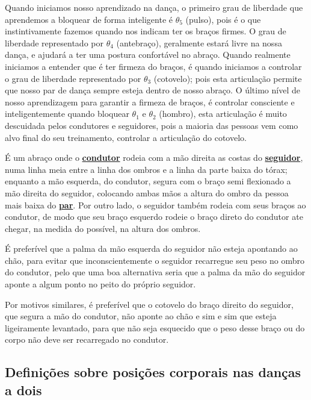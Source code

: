Quando iniciamos nosso aprendizado na dança, 
o primeiro grau de liberdade que aprendemos a bloquear de forma inteligente é $\theta_5$ (pulso),
pois é o que instintivamente fazemos quando nos indicam ter os braços firmes.
O grau de liberdade representado por $\theta_4$ (antebraço), geralmente estará livre na nossa dança,
e ajudará a ter uma postura confortável no abraço.
Quando realmente iniciamos a entender que é ter firmeza do braços,
é quando iniciamos a controlar o grau de liberdade representado por $\theta_3$ (cotovelo);
pois esta articulação permite que nosso par de dança sempre esteja dentro de nosso abraço.
O último nível de nosso aprendizagem para garantir a firmeza de braços,
é controlar consciente e inteligentemente quando bloquear  $\theta_1$ e $\theta_2$ (hombro),
esta articulação é muito descuidada pelos condutores e seguidores,
pois a maioria das pessoas vem como alvo final do seu treinamento,
controlar a articulação do cotovelo. 

\begin{definition}
\label{def:abracodedanca}  
É um abraço onde o \hyperref[def:Condutor]{\textbf{condutor}} 
rodeia com a mão direita as costas do \hyperref[def:Seguidor]{\textbf{seguidor}},
numa linha meia entre a linha dos ombros e a linha da parte baixa do tórax;
enquanto a mão esquerda, do condutor, segura com o braço semi flexionado a mão direita do seguidor,
colocando ambas mãos a altura do ombro da pessoa mais baixa do \hyperref[def:Par]{\textbf{par}}.
Por outro lado, o seguidor também rodeia com seus braços ao condutor,
de modo que seu braço esquerdo rodeie o braço direto do condutor ate chegar,
na medida do possível, na altura dos ombros. 

É preferível que a palma da mão esquerda do seguidor não esteja apontando ao chão,
para evitar que inconscientemente o seguidor recarregue seu peso no ombro do condutor,
pelo que uma boa alternativa seria que a palma da mão do seguidor aponte a algum ponto no peito do próprio seguidor.

Por motivos similares, é preferível que o cotovelo do braço direito do seguidor,
que segura a mão do condutor,
não aponte ao chão e sim e sim que esteja ligeiramente levantado,
para que não seja esquecido que o peso desse braço ou do corpo não deve ser recarregado no condutor. 
\end{definition}

\subsection{Definições sobre posições corporais  nas danças a dois}


